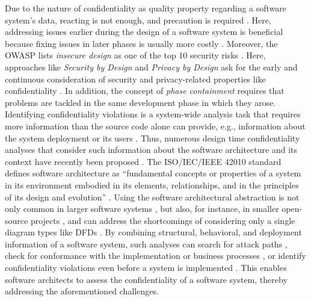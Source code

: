 Due to the nature of confidentiality as quality property regarding a software system's data, reacting is not enough, and precaution is required \cite{fernandez_methodology_2004}.
Here, addressing issues earlier during the design of a software system is beneficial because fixing issues in later phases is usually more costly \cite{shull_what_2002,boehm_software_2001}.
Moreover, the \ac{OWASP} lists \emph{insecure design} as one of the top 10 security risks \cite{owasp_foundation_owasp_2021}.
Here, approaches like \emph{Security by Design} and \emph{Privacy by Design} ask for the early and continuous consideration of security and privacy-related properties like confidentiality \cite{schaar_privacy_2010,council_of_european_union_regulation_2016,schulz_continuous_2021}.
In addition, the concept of \emph{phase containment} requires that problems are tackled in the same development phase in which they arose.
Identifying confidentiality violations is a system-wide analysis task that requires more information than the source code alone can provide, e.g., information about the system deployment or its users \cite{seifermann_architectural_2022}.
Thus, numerous design time confidentiality analyses that consider such information about the software architecture and its context have recently been proposed \cite{seifermann_architectural_2022,walter_context-based_2023,pilipchuk_architectural_2021,schneider_automatic_2023,peldszus_secure_2019,boltz_extensible_2024}.
The ISO/IEC/IEEE 42010 standard defines software architecture as \enquote{fundamental concepts or properties of a system in its environment embodied in its elements, relationships, and in the principles of its design and evolution} \cite{international_organization_for_standardization_isoiecieee_2022}.
Using the software architectural abstraction is not only common in larger software systems \cite{reussner_modeling_2016}, but also, for instance, in smaller open-source projects \cite{migliorini_architectural_2024}, and can address the shortcomings of considering only a single diagram types like \acp{DFD} \cite{sion_security_2020}.
By combining structural, behavioral, and deployment information of a software system, such analyses can search for attack paths \cite{walter_context-based_2023}, check for conformance with the implementation \cite{peldszus_secure_2019} or business processes \cite{pilipchuk_architectural_2021}, or identify confidentiality violations even before a system is implemented \cite{seifermann_detecting_2022}.
This enables software architects to assess the confidentiality of a software system, thereby addressing the aforementioned challenges.

